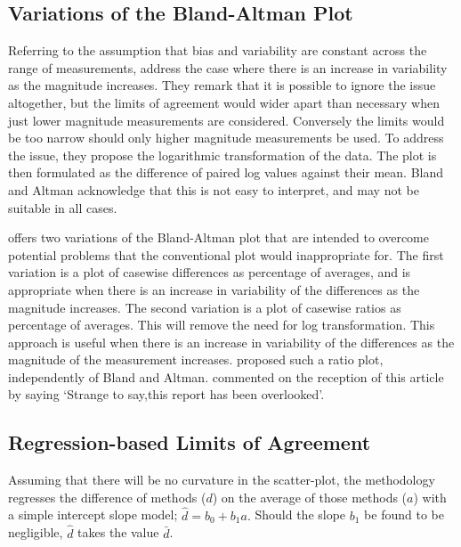 \documentclass[12pt, a4paper]{report}
\begin{document}

\subsection{Variations of the Bland-Altman Plot} Referring to the
assumption that bias and variability are constant across the range
of measurements, \citet{BA99} address the case where there is an
increase in variability as the magnitude increases. They remark
that it is possible to ignore the issue altogether, but the limits
of agreement would wider apart than necessary when just lower
magnitude measurements are considered. Conversely the limits would
be too narrow should only higher magnitude measurements be used.
To address the issue, they propose the logarithmic transformation
of the data. The plot is then formulated as the difference of
paired log values against their mean. Bland and Altman acknowledge
that this is not easy to interpret, and may not be suitable in
all cases.

\citet{BA99} offers two variations of the Bland-Altman plot that
are intended to overcome potential problems that the conventional
plot would inappropriate for. The first variation is a plot of
casewise differences as percentage of averages, and is appropriate
when there is an increase in variability of the differences as the
magnitude increases. The second variation is a plot of casewise
ratios as percentage of averages. This will remove the need for
log transformation. This approach is useful when there is an
increase in variability of the differences as the magnitude of the
measurement increases. \citet{Eksborg} proposed such a ratio plot,
independently of Bland and Altman. \citet{Dewitte} commented on
the reception of this article by saying `Strange to say,this
report has been overlooked'.




\subsection{Regression-based Limits of Agreement} Assuming that
there will be no curvature in the scatter-plot, the methodology
regresses the difference of methods ($d$) on the average of those
methods ($a$) with a simple intercept slope model; $\hat{d} =
b_{0}+ b_{1}a.$ Should the slope $b_{1}$ be found to be
negligible, $\hat{d}$ takes the value $\bar{d}$.
\end{document}
